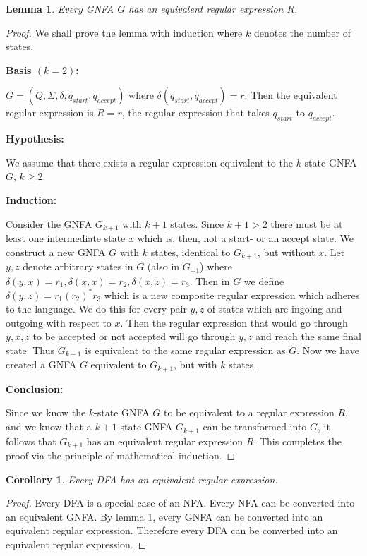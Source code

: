 \documentclass[12pt]{article}
\newtheorem{lemma}{Lemma}
\newtheorem{corollary}{Corollary}
\begin{document}
\begin{lemma}
    Every GNFA \(G\) has an equivalent regular expression \(R\).  
\end{lemma}
\begin{proof}
    We shall prove the lemma with induction where \(k\) denotes the number of 
    states. 

    \noindent 
    \textbf{Basis \((k = 2)\): }

    \noindent 
    \(G = (Q, \Sigma, \delta, q_{start}, q_{accept})\)
    where \(\delta(q_{start}, q_{accept}) = r\). Then the 
    equivalent regular expression is \(R = r\), the regular expression that 
    takes \(q_{start}\) to \(q_{accept}\).  

    \noindent 
    \textbf{Hypothesis: }

    \noindent 
    We assume that there exists a regular expression equivalent 
    to the \(k\)-state GNFA \(G\), \(k \geq 2\). 

    \noindent 
    \textbf{Induction: }

    \noindent
    Consider the GNFA \(G_{k+1}\) with \(k + 1\) states. 
    Since \(k + 1 > 2\) there must be at least one 
    intermediate state \(x\) which is, then, not 
    a start- or an accept state. We construct a new GNFA \(G\) 
    with \(k\) states, identical to \(G_{k+1}\), but without \(x\). 
    Let \(y,z\) denote arbitrary states in \(G\) (also in \(G_{+1}\)) where 
    \(\delta(y,x) = r_1, \delta(x,x) = r_2, \delta(x,z) = r_3\). 
    Then in \(G\) we define \(\delta(y,z) = r_1(r_2)^*r_3\) which is 
    a new composite regular expression which adheres to the language.
    We do this for every pair \(y,z\) of states which are ingoing and 
    outgoing with respect to \(x\).
    Then the regular expression that would go through \(y,x,z\) to be accepted 
    or not accepted will go through \(y,z\) and reach the same final state.  
    Thus \(G_{k+1}\) is equivalent to the same regular expression 
    as \(G\). 
    Now we have created a GNFA \(G\) equivalent to \(G_{k+1}\), but with 
    \(k\) states.

    \noindent 
    \textbf{Conclusion: }

    \noindent
    Since we know the \(k\)-state GNFA \(G\) to be equivalent to a regular 
    expression \(R\), and we know that a \(k + 1\)-state GNFA \(G_{k+1}\)
    can be transformed into \(G\), it follows that \(G_{k+1}\) has an 
    equivalent regular expression \(R\).
    This completes the proof via the principle of mathematical induction.
    
\end{proof}
\begin{corollary}
    Every DFA has an equivalent regular expression. 
\end{corollary}
\begin{proof}
    Every DFA is a special case of an NFA. 
    Every NFA can be converted into an equivalent GNFA. 
    By lemma 1, every GNFA can be converted into an equivalent 
    regular expression. 
    Therefore every DFA can be converted into an equivalent regular expression.
\end{proof}
\end{document}
